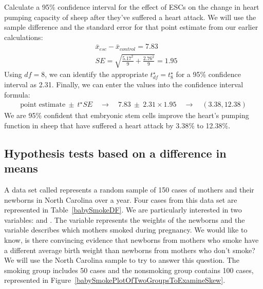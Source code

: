 {\begin{example}{Calculate a 95\% confidence interval for the effect of ESCs on the change in heart pumping capacity of sheep after they've suffered a heart attack.}
We will use the sample difference and the standard error for that point estimate from our earlier calculations:\textC{\vspace{-3mm}}
\begin{align*}
& \bar{x}_{esc} - \bar{x}_{control} = 7.83 \\
& SE = \sqrt{\frac{5.17^2}{9} + \frac{2.76^2}{9}} = 1.95
\end{align*}
Using $df = 8$, we can identify the appropriate $t^{\star}_{df} = t^{\star}_{8}$ for a 95\% confidence interval as 2.31. Finally, we can enter the values into the confidence interval formula:\textC{\vspace{-1mm}}
\begin{align*}
\text{point estimate} \ \pm\ t^{\star}SE \quad\rightarrow\quad
7.83 \ \pm\ 2.31\times 1.95 \quad\rightarrow\quad (3.38, 12.38)
\end{align*}
We are 95\% confident that embryonic stem cells improve the heart's pumping function in sheep that have suffered a heart attack by 3.38\% to 12.38\%.
\end{example}



\subsection{Hypothesis tests based on a difference in means}


A data set called  represents a random sample of 150 cases of mothers and their newborns in North Carolina over a year. Four cases from this data set are represented in Table~\ref{babySmokeDF}. We are particularly interested in two variables:  and . The  variable represents the weights of the newborns and the  variable describes which mothers smoked during pregnancy. We would like to know, is there convincing evidence that newborns from mothers who smoke have a different average birth weight than newborns from mothers who don't smoke? We will use the North Carolina sample to try to answer this question. The smoking group includes 50 cases and the nonsmoking group contains 100 cases, represented in Figure~\ref{babySmokePlotOfTwoGroupsToExamineSkew}.

}
